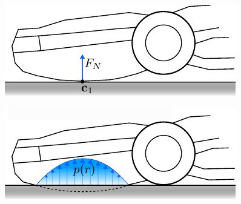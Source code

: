 \begin{center}
    \renewcommand{\arraystretch}{1.2}
    \begin{minipage}{.48\linewidth}
        \vspace{0pt}
        \centering
        \includegraphics[width=.95\textwidth]{chapters/modeling/fig/side_distribution_schematic-single.pdf}
    \end{minipage}%
    \hfill%
    \begin{minipage}{.48\linewidth}
        \vspace{0pt}
        \centering
        \includegraphics[width=.95\textwidth]{chapters/modeling/fig/side_distribution_schematic-2.pdf}
    \end{minipage}%
    \vspace{15pt}
    \begin{minipage}[t]{.48\linewidth}
        \vspace{0pt}
        \captionsetup{type=figure}
        \label{fig:model-side-point}
    \end{minipage}%
    \hfill%
    \begin{minipage}[t]{.48\linewidth}
        \vspace{0pt}
        \captionsetup{type=figure}
        \label{fig:model-side-surface}
    \end{minipage}%
\end{center}

